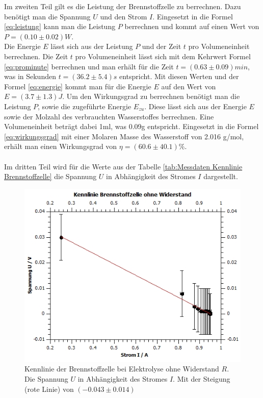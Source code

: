 \documentclass[12pt,a4paper,twoside]{article}
\begin{document}
\noindent
Im zweiten Teil gilt es die Leistung der Brennstoffzelle zu berrechnen. Dazu benötigt man die Spannung $U$ und den Strom $I$. 
Eingesetzt in die Formel \ref{eq:leistung} kann man die Leistung $P$ berrechnen und kommt auf einen Wert von $P = (0.10 \pm 0.02)W$. 
\\
Die Energie $E$ lässt sich aus der Leistung $P$ und der Zeit $t$ pro Volumeneinheit berrechnen. Die Zeit $t$ pro Volumeneinheit lässt sich mit dem Kehrwert Formel \ref{eq:prominute} berrechnen und man erhält für die Zeit $t = (0.63 \pm 0.09)min$, was in Sekunden $t = (36.2 \pm 5.4)s$ entspricht. 
Mit diesen Werten und der Formel \ref{eq:energie} kommt man für die Energie $E$ auf den Wert von $E = (3.7 \pm 1.3)J$. 
Um den Wirkungsgrad zu berrechnen benötigt man die Leistung $P$, sowie die zugeführte Energie $E_{zu}$. Diese lässt sich aus der Energie $E$ sowie der Molzahl des verbrauchten Wasserstoffes berrechnen. Eine Volumeneinheit beträgt dabei 1ml, was 0.09g entspricht. 
Eingesetzt in die Formel \ref{eq:wirkungsgrad} mit einer Molaren Masse des Wasserstoff von 2.016 g/mol, erhält man einen Wirkungsgrad von $\eta = (60.6 \pm 40.1)\%$. 
\\
\\
Im dritten Teil wird für die Werte aus der Tabelle \ref{tab:Messdaten Kennlinie Brennstoffzelle} die Spannung $U$ in Abhängigkeit des Stromes $I$ dargestellt. 

\begin{figure}[H]
    \centering
    \includegraphics[width=0.6\linewidth]{nudes/brennstoff diagramm ohne r.jpg}
    \caption{Kennlinie der Brennstoffzelle bei Elektrolyse ohne Widerstand $R$. Die Spannung $U$ in Abhängigkeit des Stromes $I$. Mit der Steigung (rote Linie) von $(-0.043 \pm 0.014)$}
    \label{fig:diagramm Brennstoffzelle ohne R}
\end{figure}
\end{document}
